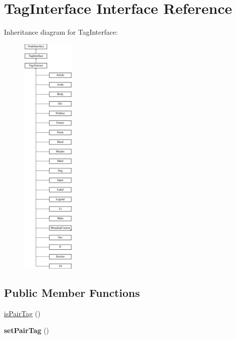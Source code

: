 \hypertarget{interface_pes_1_1_dom_1_1_node_1_1_tag_1_1_tag_interface}{}\section{Tag\+Interface Interface Reference}
\label{interface_pes_1_1_dom_1_1_node_1_1_tag_1_1_tag_interface}
Inheritance diagram for Tag\+Interface\+:\begin{figure}[H]
\begin{center}
\leavevmode
\includegraphics[height=12.000000cm]{interface_pes_1_1_dom_1_1_node_1_1_tag_1_1_tag_interface}
\end{center}
\end{figure}
\subsection*{Public Member Functions}
\begin{DoxyCompactItemize}
\item 
\mbox{\hyperlink{interface_pes_1_1_dom_1_1_node_1_1_tag_1_1_tag_interface_a8d496f376687a9da8397563a92d43918}{is\+Pair\+Tag}} ()
\item 
\mbox{\label{interface_pes_1_1_dom_1_1_node_1_1_tag_1_1_tag_interface_a3f55f8d0e1141c994db6247bc5be1649}} 
{\bfseries set\+Pair\+Tag} ()
\end{DoxyCompactItemize}



